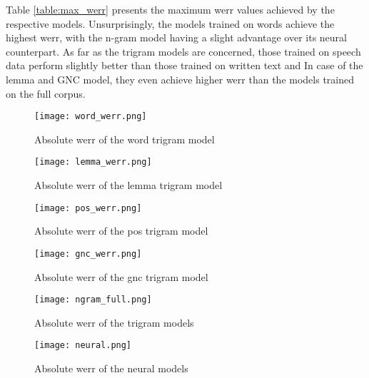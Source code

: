  Table \ref{table:max_werr} presents the maximum \gls{werr} values achieved by the respective models. Unsurprisingly, the models trained on words achieve the highest \gls{werr}, with the n-gram model having a slight advantage over its neural counterpart. As far as the trigram models are concerned, those trained on speech data perform slightly better than those trained on written text and In case of the lemma and GNC model, they even achieve higher \gls{werr} than the models trained on the full corpus.

\begin{figure}[!htbp]
	  \centering
	  \texttt{[image: word\_werr.png]}
	  \caption{Absolute \gls{werr} of the word trigram model}
	      \label{figure:word}
\end{figure}

\begin{figure}[!htbp]
	  \centering
	  \texttt{[image: lemma\_werr.png]}
	  \caption{Absolute \gls{werr} of the lemma trigram model}
	      \label{figure:lemma}
\end{figure}

\begin{figure}[!htbp]
	  \centering
	  \texttt{[image: pos\_werr.png]}
	  \caption{Absolute \gls{werr} of the pos trigram model}
	      \label{figure:pos}
\end{figure}

\begin{figure}[!htbp]
	  \centering
	  \texttt{[image: gnc\_werr.png]}
	  \caption{Absolute \gls{werr} of the gnc trigram model}
	      \label{figure:gnc}
\end{figure}

\begin{figure}[!htbp]
	  \centering
	  \texttt{[image: ngram\_full.png]}
	  \caption{Absolute \gls{werr} of the trigram models}
	      \label{figure:neural}
\end{figure}

\begin{figure}[!htbp]
	  \centering
	  \texttt{[image: neural.png]}
	  \caption{Absolute \gls{werr} of the neural models}
	      \label{figure:neural}
\end{figure}

\FloatBarrier
